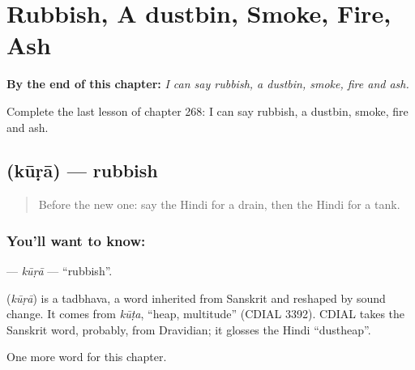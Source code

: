 
\chapter{Rubbish, A dustbin, Smoke, Fire, Ash}
\label{ch:hi-rubbish-a-dustbin-smoke-fire-ash}

\begin{chapteropening}
\textbf{By the end of this chapter:} \emph{I can say rubbish, a dustbin, smoke, fire and ash.}

Complete the last lesson of chapter 268: I can say rubbish, a dustbin, smoke, fire and ash.
\end{chapteropening}

\section[\texorpdfstring{\hi{कूड़ा} (kūṛā)}{कूड़ा (kūṛā)}]{ (kūṛā) — rubbish}

\label{lesson:HI-C268-kura}



\begin{quote}
Before the new one: say the Hindi for a drain, then the Hindi for a tank.
\end{quote}

\subsection*{You'll want to know: }
\textbf{} — \emph{kūṛā} — \textquotedblleft{}rubbish\textquotedblright{}.

\begin{cousinweb}
\textbf{} (\emph{kūṛā}) is a tadbhava, a word inherited from Sanskrit and reshaped by sound change. It comes from \emph{kūṭa}, \textquotedblleft{}heap, multitude\textquotedblright{} (CDIAL 3392). CDIAL takes the Sanskrit word, probably, from Dravidian; it glosses the Hindi \textquotedblleft{}dustheap\textquotedblright{}.
\end{cousinweb}

\begin{grammarlens}[title={What you've built}]
One more word for this chapter.
\end{grammarlens}

